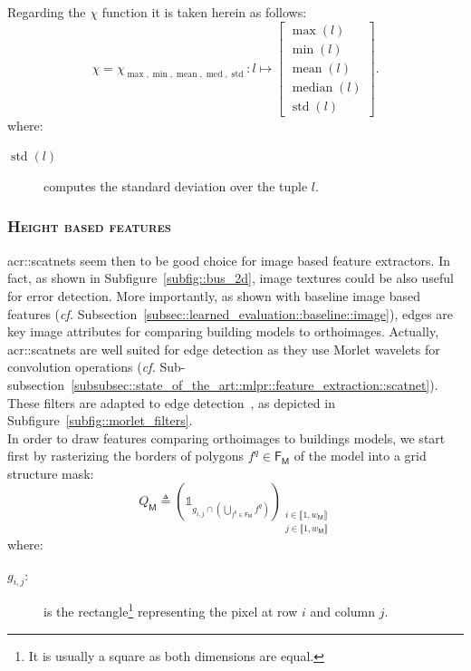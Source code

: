             Regarding the \(\chi\) function it is taken herein as follows:
            \begin{equation}
                \label{eq::max_min_mean_med_std_extractor}
                \chi = \chi_{\max,\min,\operatorname{mean},\operatorname{med},\operatorname{std}}: l \mapsto \begin{bmatrix}
                    \max(l)\\
                    \min(l)\\
                    \operatorname{mean}(l)\\
                    \operatorname{median}(l)\\
                    \operatorname{std}(l)
                \end{bmatrix}.
            \end{equation}
            where:
            \begin{description}
                \item[\(\operatorname{std}(l)\)] computes the standard deviation over the tuple \(l\).
            \end{description}

        \subsubsection{\textsc{Height based features}}
            \glspl{acr::scatnet} seem then to be good choice for image based feature extractors.
            In fact, as shown in Subfigure~\ref{subfig::bus_2d}, image textures could be also useful for error detection.
            More importantly, as shown with baseline image based features (\textit{cf.} Subsection~\ref{subsec::learned_evaluation::baseline::image}), edges are key image attributes for comparing building models to orthoimages.
            Actually, \glspl{acr::scatnet} are well suited for edge detection as they use Morlet wavelets for convolution operations (\textit{cf.} Sub-subsection~\ref{subsubsec::state_of_the_art::mlpr::feature_extraction::scatnet}).
            These filters are adapted to edge detection~\parencite{zhang2007radon}, as depicted in Subfigure~\ref{subfig::morlet_filters}.\\

            In order to draw features comparing orthoimages to buildings models, we start first by rasterizing the borders of polygons \(f^q \in \mathsf{F_M}\) of the model into a grid structure mask:
            \begin{equation}
                \label{eq::borders_mask}
                Q_{\mathsf{M}} \triangleq \left(\mathbb{1}_{g_{i,j} \cap \left(\bigcup_{f^q \in \mathsf{F_M}}f^q\right)}\right)_{\substack{i \in \llbracket 1, w_\mathsf{M} \rrbracket\\j \in \llbracket 1, w_\mathsf{M} \rrbracket}}
            \end{equation}
            where:
            \begin{description}
                \item[\(g_{i,j}\):] is the rectangle\footnote{It is usually a square as both dimensions are equal.} representing the pixel at row \(i\) and column \(j\).
            \end{description}

